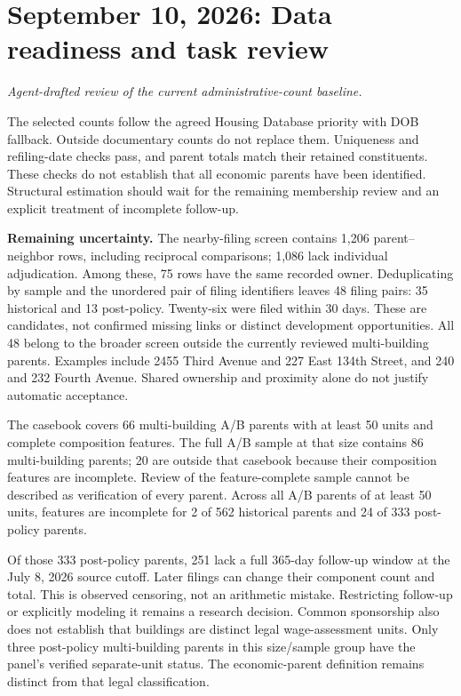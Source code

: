 \clearpage
\section*{September 10, 2026: Data readiness and task review}
\textit{Agent-drafted review of the current administrative-count baseline.}

The selected counts follow the agreed Housing Database priority with DOB fallback. Outside documentary counts do not replace them. Uniqueness and refiling-date checks pass, and parent totals match their retained constituents. These checks do not establish that all economic parents have been identified. Structural estimation should wait for the remaining membership review and an explicit treatment of incomplete follow-up.

\textbf{Remaining uncertainty.} The nearby-filing screen contains 1,206 parent--neighbor rows, including reciprocal comparisons; 1,086 lack individual adjudication. Among these, 75 rows have the same recorded owner. Deduplicating by sample and the unordered pair of filing identifiers leaves 48 filing pairs: 35 historical and 13 post-policy. Twenty-six were filed within 30 days. These are candidates, not confirmed missing links or distinct development opportunities. All 48 belong to the broader screen outside the currently reviewed multi-building parents. Examples include 2455 Third Avenue and 227 East 134th Street, and 240 and 232 Fourth Avenue. Shared ownership and proximity alone do not justify automatic acceptance.

The casebook covers 66 multi-building A/B parents with at least 50 units and complete composition features. The full A/B sample at that size contains 86 multi-building parents; 20 are outside that casebook because their composition features are incomplete. Review of the feature-complete sample cannot be described as verification of every parent. Across all A/B parents of at least 50 units, features are incomplete for 2 of 562 historical parents and 24 of 333 post-policy parents.

Of those 333 post-policy parents, 251 lack a full 365-day follow-up window at the July 8, 2026 source cutoff. Later filings can change their component count and total. This is observed censoring, not an arithmetic mistake. Restricting follow-up or explicitly modeling it remains a research decision. Common sponsorship also does not establish that buildings are distinct legal wage-assessment units. Only three post-policy multi-building parents in this size/sample group have the panel's verified separate-unit status. The economic-parent definition remains distinct from that legal classification.

